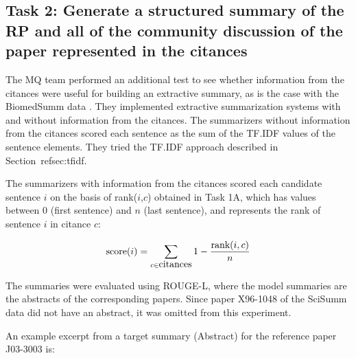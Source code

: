 \documentclass[11pt]{article}
\begin{document}
\subsection{Task 2: Generate a structured summary of the RP and all of the community discussion of the paper represented in the citances}

The MQ team performed an additional test to see whether information
from the citances were useful for building an extractive summary, as
is the case with the BiomedSumm data \cite{Molla:ALTA2014}. They
implemented extractive summarization systems with and without
information from the citances.  The summarizers without information
from the citances scored each sentence as the sum of the TF.IDF values
of the sentence elements. They tried the TF.IDF approach described in
Section~ref{sec:tfidf}.

The summarizers with information from the citances scored each candidate 
sentence $i$ on the basis of rank($i$,$c$) obtained in Task 1A, which has 
values between 0 (first sentence) and $n$ (last sentence), and represents 
the rank of sentence $i$ in citance $c$:

$$
\hbox{score}(i) = \sum_{c\in\hbox{citances}}1-\frac{\hbox{rank}(i,c)}{n}
$$

The summaries were evaluated using ROUGE-L, where the model summaries are 
the abstracts of the corresponding papers. Since paper X96-1048 of 
the SciSumm data did not have an abstract, it was omitted from this 
experiment.

An example excerpt from a target summary (Abstract) for the reference 
paper J03-3003 is:

\noindent{}
\end{document}
